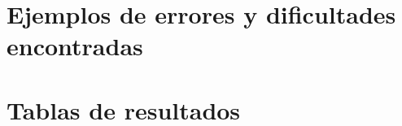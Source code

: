 \documentclass[12pt,twoside,titlepage]{report}
\begin{document}


\chapter{Ejemplos de errores y dificultades encontradas}
\label{sec:apendice4}



\chapter{Tablas de resultados}
\label{sec:apendice5}



\end{document}
